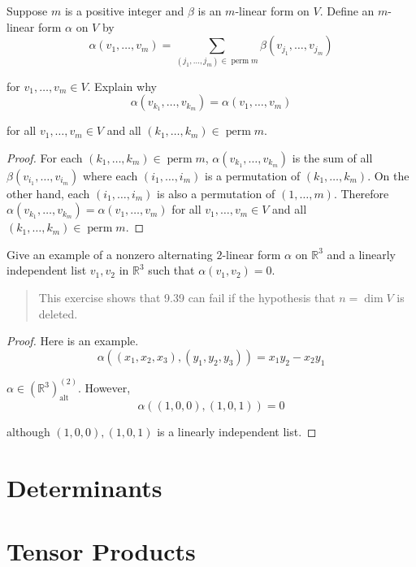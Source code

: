 \begin{exercise}\label{chapter9:sectionB:exercise6}
    Suppose $m$ is a positive integer and $\beta$ is an $m$-linear form on $V$. Define an $m$-linear form $\alpha$ on $V$ by
    \[
        \alpha(v_{1}, \ldots, v_{m}) = \sum_{(j_{1}, \ldots, j_{m})\in\operatorname{perm}m}\beta(v_{j_{1}}, \ldots, v_{j_{m}})
    \]

    for $v_{1}, \ldots, v_{m}\in V$. Explain why
    \[
        \alpha(v_{k_{1}}, \ldots, v_{k_{m}}) = \alpha(v_{1}, \ldots, v_{m})
    \]

    for all $v_{1}, \ldots, v_{m}\in V$ and all $(k_{1}, \ldots, k_{m})\in\operatorname{perm}m$.
\end{exercise}

\begin{proof}
    For each $(k_{1}, \ldots, k_{m})\in\operatorname{perm}m$, $\alpha(v_{k_{1}}, \ldots, v_{k_{m}})$ is the sum of all $\beta(v_{i_{1}}, \ldots, v_{i_{m}})$ where each $(i_{1}, \ldots, i_{m})$ is a permutation of $(k_{1}, \ldots, k_{m})$. On the other hand, each $(i_{1}, \ldots, i_{m})$ is also a permutation of $(1, \ldots, m)$. Therefore $\alpha(v_{k_{1}}, \ldots, v_{k_{m}}) = \alpha(v_{1}, \ldots, v_{m})$ for all $v_{1}, \ldots, v_{m}\in V$ and all $(k_{1}, \ldots, k_{m})\in\operatorname{perm}m$.
\end{proof}
\newpage

\begin{exercise}\label{chapter9:sectionB:exercise7}
    Give an example of a nonzero alternating $2$-linear form $\alpha$ on $\mathbb{R}^{3}$ and a linearly independent list $v_{1}, v_{2}$ in $\mathbb{R}^{3}$ such that $\alpha(v_{1}, v_{2}) = 0$.
\end{exercise}

\begin{quote}
    This exercise shows that 9.39 can fail if the hypothesis that $n = \dim V$ is deleted.
\end{quote}

\begin{proof}
    Here is an example.
    \[
        \alpha((x_{1}, x_{2}, x_{3}), (y_{1}, y_{2}, y_{3})) = x_{1}y_{2} - x_{2}y_{1}
    \]

    $\alpha\in {(\mathbb{R}^{3})}^{(2)}_{\text{alt}}$. However,
    \[
        \alpha((1, 0, 0), (1, 0, 1)) = 0
    \]

    although $(1, 0, 0), (1, 0, 1)$ is a linearly independent list.
\end{proof}
\newpage

\section{Determinants}

\section{Tensor Products}

